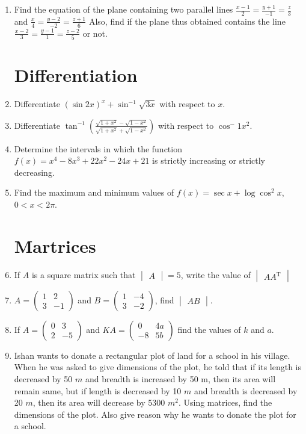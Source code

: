 \documentclass[12pt,-letter paper]{article}
\newcommand{\myvec}[1]{\ensuremath{\begin{pmatrix}#1\end{pmatrix}}}
\newcommand{\mydet}[1]{\ensuremath{\begin{vmatrix}#1\end{vmatrix}}}
\providecommand{\brak}[1]{\ensuremath{\left(#1\right)}}
\providecommand{\brak}[1]{\ensuremath{\left(#1\right)}}
\begin{document}
\begin{enumerate}
	\item Find the equation of the plane containing two parallel lines
$\frac{x-1}{2} = \frac{y+1}{-1} = \frac{z}{3}$ and $\frac{x}{4} = \frac{y-2}{-2} = \frac{z+1}{6}$
Also, find if the plane thus obtained contains the line 
$\frac{x-2}{3} =\frac{y-1}{1} = \frac{z-2}{5}$ or not.


\section{Differentiation}
	\item Differentiate $(\sin 2x)^x + \sin^{-1} \sqrt{3x}$ with respect to $x$.
	
	\item Differentiate $\tan^{-1} \brak{\frac{\sqrt{1 + x^2}-\sqrt{1-x^2}}{\sqrt{1+x^2}+\sqrt{1-x^2}}}$
with respect to $\cos^-1 x^2$.

	\item Determine the intervals in which the function $f (x) = x^4 - 8x^3 + 22x^2 - 24x+21$ is strictly increasing or strictly decreasing.

	\item Find the maximum and minimum values of $f (x) = \sec x + \log \cos^2 x$, $0 < x < 2\pi$.



\section{Martrices}
	\item If $A$ is a square matrix such that $\mydet{A} = 5$, write the value of 
$\mydet{AA^{\text{T}}}$

	\item $A = \myvec{1 & 2 \\ 3 & -1}$ and $B = \myvec{1 & -4 \\ 3 & -2}$, find $\mydet{AB}$.

	\item If $A = \myvec{0 & 3 \\ 2 & -5}$ and $KA = \myvec{0 & 4a \\ -8 & 5b}$ find the values of $k$ and $a$.

	\item Ishan wants to donate a rectangular plot of land for a school in his village. When he was asked to give dimensions of the plot, he told that if its length is decreased by 50 $m$ and breadth is increased by 50 m, then its area will remain same, but if length is decreased by 10 $m$ and breadth is decreased by 20 $m$, then its area will decrease by 5300 $m^2$. Using matrices, find the dimensions of the plot. Also give reason why he wants to donate the plot for a school.


\end{enumerate}
\end{document}

